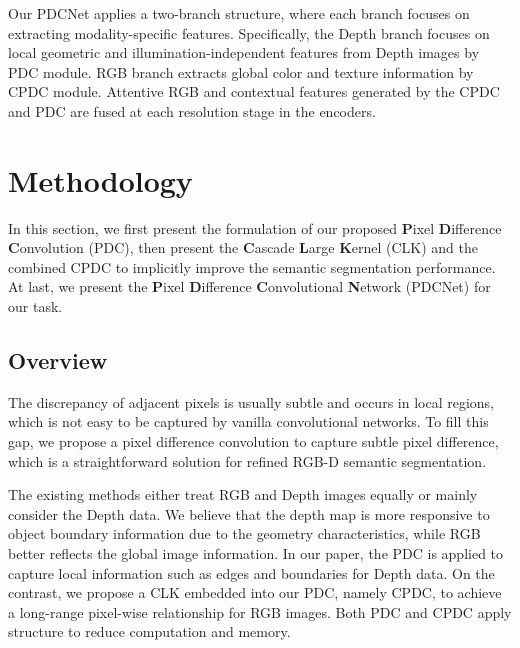 \documentclass[lettersize,journal]{IEEEtran}
\begin{document}
\iffalse
Wang \textit{et~al.} \cite{wang2018Depth} propose a Depth-aware convolution and Depth-aware average pooling to leverage Depth similarity between pixels in the process of information propagation. Although this method is very inspiring, it does not consider the characteristics of RGB images. 
\fi

Our PDCNet applies a two-branch structure, where each branch focuses on extracting modality-specific features. Specifically, the Depth branch focuses on local geometric and illumination-independent features from Depth images by PDC module. RGB branch extracts global color and texture information by CPDC module. Attentive RGB and contextual features generated by the CPDC and PDC are fused at each resolution stage in the encoders.








\section{Methodology}
In this section, we first present the formulation of our proposed \textbf{P}ixel \textbf{D}ifference \textbf{C}onvolution (PDC), then present the \textbf{C}ascade \textbf{L}arge \textbf{K}ernel (CLK) and the combined CPDC to implicitly improve the semantic segmentation performance. At last, we present the \textbf{P}ixel \textbf{D}ifference \textbf{C}onvolutional \textbf{N}etwork (PDCNet) for our task.



\subsection{Overview}
\iffalse In this section, we mainly explain the motivation of the Differential Dynamic Convolution Attention and Ensemble Large kernel attention.\fi 

The discrepancy of adjacent pixels is usually subtle and occurs in local regions, which is not easy to be captured by vanilla convolutional networks. To fill this gap, we propose a pixel difference convolution to capture subtle pixel difference, which is a straightforward solution for refined RGB-D semantic segmentation.

The existing methods either treat RGB and Depth images equally or mainly consider the Depth data. We believe that the depth map is more responsive to object boundary information due to the geometry characteristics, while RGB better reflects the global image information. In our paper, the PDC is applied to capture local information such as edges and boundaries for Depth data. On the contrast, we propose a CLK embedded into our PDC, namely CPDC, to achieve a long-range pixel-wise relationship for RGB images. Both PDC and CPDC apply    \cite{chollet2017xception} structure to reduce computation and memory.
\end{document}
